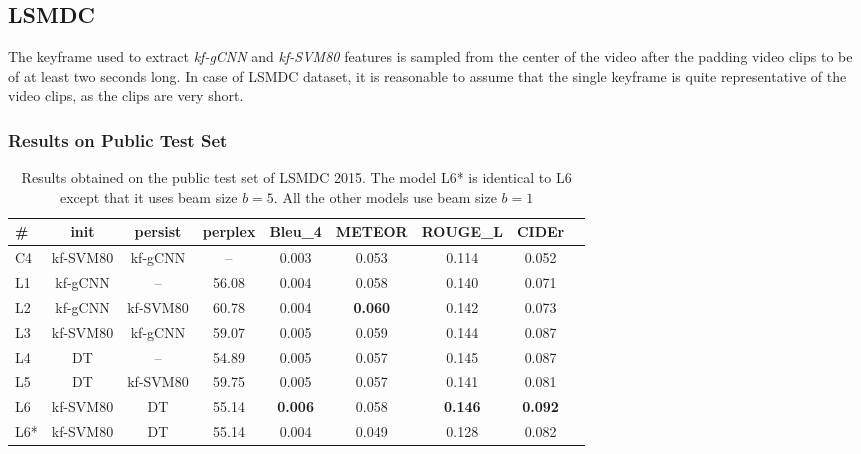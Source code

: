 \subsection{LSMDC}
The keyframe used to extract \emph{kf-gCNN} and \emph{kf-SVM80} features is
sampled from the center of the video after the padding video clips to be of at
least two seconds long.
In case of LSMDC dataset, it is reasonable to assume that the single keyframe is
quite representative of the video clips, as the clips are very short.

\subsubsection{Results on Public Test Set}
\begin{table}[tbh]
  \newcommand{\modpar}[4]{%
    \multirow{2}{*}{\emph{#1}} & \multirow{2}{*}{#2} & \multirow{2}{*}{#3}
    & \multirow{2}{*}{#4}}
  \newcommand{\bs}{\bf \small}
  \centering
  \begin{adjustbox}{center}
    \begin{tabular}{|l|c|c|c|c|c|c|c|c|}
        \hline\hline
        \bs \#   &\bs init &\bs persist &\bs perplex&\bs Bleu\_4&\bs METEOR &\bs ROUGE\_L &\bs CIDEr  \\\hline\hline
        C4   & kf-SVM80 & kf-gCNN  &  --   & 0.003   &   0.053 &   0.114&   0.052 \\\hline
        L1   & kf-gCNN  & --    & 56.08 & 0.004   &   0.058 &   0.140&   0.071 \\
        L2   & kf-gCNN  & kf-SVM80 & 60.78 & 0.004   &\bf0.060 &   0.142&   0.073 \\
        L3   & kf-SVM80 & kf-gCNN  & 59.07 & 0.005   &   0.059 &   0.144&   0.087 \\\hline
        L4   & DT    & --    & 54.89 & 0.005   &   0.057 &   0.145&   0.087 \\
        L5   & DT    & kf-SVM80 & 59.75 & 0.005   &   0.057 &   0.141&   0.081 \\
        L6   & kf-SVM80 & DT    & 55.14 &\bf0.006 &   0.058 &\bf0.146&\bf0.092 \\
        L6*  & kf-SVM80 & DT    & 55.14 &   0.004 &   0.049 &   0.128 &   0.082 \\\hline 
    \end{tabular}
  \end{adjustbox}
    \caption{Results obtained on the public test set of LSMDC 2015. The model
    L6* is identical to L6 except that it uses beam size $b=5$. All the other
    models use beam size $b=1$}
    \label{tab:resLsmdcVal}
\end{table}

